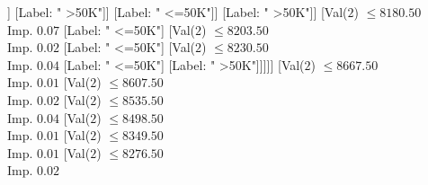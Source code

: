 \documentclass[margin=10pt]{standalone}
\begin{document}
\begin{forest}
																																	[Val($2$) $ \leq 8005.50$ \\ Imp. $0.01$
																																		[Label: " <=50K"]
																																		[Val($2$) $ \leq 8046.50$ \\ Imp. $0.02$
																																			[Label: " >50K"]
																																			[Val($2$) $ \leq 8235.50$ \\ Imp. $0.01$
																																				[Val($2$) $ \leq 8174.50$ \\ Imp. $0.04$
																																					[Val($2$) $ \leq 8170.50$ \\ Imp. $0.06$
																																						[Val($2$) $ \leq 8150.50$ \\ Imp. $0.09$
																																							[Val($2$) $ \leq 8128.50$ \\ Imp. $0.15$
																																								[Val($2$) $ \leq 8074.50$ \\ Imp. $0.03$
																																									[Label: " >50K"]
																																									[Label: " <=50K"]]
																																								[Label: " >50K"]]
																																							[Label: " <=50K"]]
																																						[Label: " >50K"]]
																																					[Val($2$) $ \leq 8180.50$ \\ Imp. $0.07$
																																						[Label: " <=50K"]
																																						[Val($2$) $ \leq 8203.50$ \\ Imp. $0.02$
																																							[Label: " <=50K"]
																																							[Val($2$) $ \leq 8230.50$ \\ Imp. $0.04$
																																								[Label: " <=50K"]
																																								[Label: " >50K"]]]]]
																																				[Val($2$) $ \leq 8667.50$ \\ Imp. $0.01$
																																					[Val($2$) $ \leq 8607.50$ \\ Imp. $0.02$
																																						[Val($2$) $ \leq 8535.50$ \\ Imp. $0.04$
																																							[Val($2$) $ \leq 8498.50$ \\ Imp. $0.01$
																																								[Val($2$) $ \leq 8349.50$ \\ Imp. $0.01$
																																									[Val($2$) $ \leq 8276.50$ \\ Imp. $0.02$

\end{forest}
\end{document}
